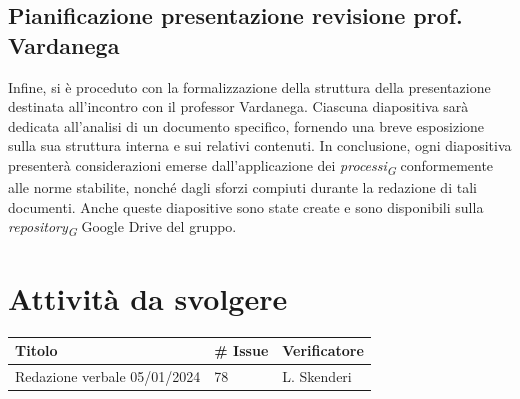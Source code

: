 \documentclass{article}
\begin{document}
\subsection{Pianificazione presentazione revisione prof. Vardanega}
Infine, si è proceduto con la formalizzazione della struttura della presentazione destinata all'incontro con il professor Vardanega. Ciascuna diapositiva sarà dedicata all'analisi di un documento specifico, fornendo una breve esposizione sulla sua struttura interna e sui relativi contenuti. In conclusione, ogni diapositiva presenterà considerazioni emerse dall'applicazione dei \textit{processi}\textsubscript{\textit{G}} conformemente alle norme stabilite, nonché dagli sforzi compiuti durante la redazione di tali documenti.
Anche queste diapositive sono state create e sono disponibili sulla \textit{repository}\textsubscript{\textit{G}} Google Drive del gruppo.


\section{Attività da svolgere}
    \begin{center}
        \begin{tabular}{|C{7cm}|C{1,5cm}|C{3cm}|}
            \hline
            \textbf{Titolo} & \textbf{\# Issue} & \textbf{Verificatore} \\
            \hline\hline
            Redazione verbale 05/01/2024 & 78 & L. Skenderi \\
            \hline
        \end{tabular}
    \end{center}
\end{document}
